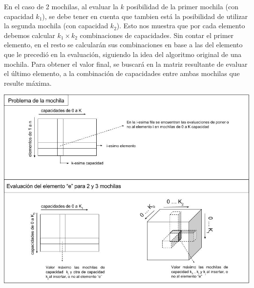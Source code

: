 
  En el caso de 2 mochilas, al evaluar la $k$ posibilidad de la primer mochila (con capacidad $k_{1}$), se debe tener en cuenta que tambien está la posibilidad de utilizar la segunda mochila (con capacidad $k_{2}$). Esto nos muestra que por cada elemento debemos calcular $k_{1} \times k_{2}$ combinaciones de capacidades. Sin contar el primer elemento, en el resto se calcularán sus combinaciones en base a las del elemento que le precedió en la evaluación, siguiendo la idea del algoritmo original de una mochila. Para obtener el valor final, se buscará en la matriz resultante de evaluar el último elemento, a la combinación de capacidades entre ambas mochilas que resulte máxima.\\
  

  \vspace*{0.3cm} \vspace*{0.3cm}
  \begin{center}
 \includegraphics[scale=0.6]{./EJ3/dibujo-matrices.jpg}
  \end{center}
  \vspace*{0.3cm}
  
